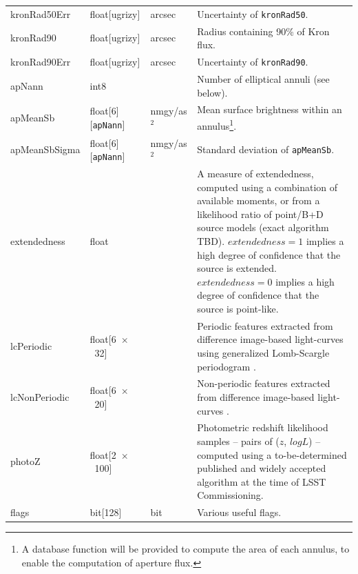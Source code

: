 \documentclass[12pt]{article}
\newcommand\x         {\hbox{$\times$}}
\begin{document}
\begin{center}
\begin{longtable}{p{3cm}p{2cm}p{2cm}p{5cm}}
kronRad50Err & float[ugrizy] & arcsec & Uncertainty of {\tt kronRad50}. \\

kronRad90 & float[ugrizy] & arcsec & Radius containing 90\% of Kron flux. \\

kronRad90Err & float[ugrizy] & arcsec & Uncertainty of {\tt kronRad90}. \\


apNann & int8 & ~ & Number of elliptical annuli (see below). \\

apMeanSb & float[6][{\tt apNann}] & nmgy/as$^2$ & Mean surface brightness within an annulus\footnote{A database function will be provided to compute the area of each annulus, to enable the computation of aperture flux.}. \\

apMeanSbSigma & float[6][{\tt apNann}] & nmgy/as$^2$ & Standard deviation of {\tt apMeanSb}. \\

extendedness & float & ~ & A measure of extendedness, computed using a combination of available moments, or from a likelihood ratio of point/B+D source models (exact algorithm TBD). $extendedness=1$ implies a high degree of confidence that the source is extended. $extendedness=0$ implies a high degree of confidence that the source is point-like. \\

lcPeriodic & float[6~\x~32] & ~ & Periodic features extracted from difference image-based light-curves using generalized Lomb-Scargle periodogram \citep[Table~4,][]{2011ApJ...733...10R}.\\

lcNonPeriodic & float[6~\x~20] & ~ & Non-periodic features extracted from difference image-based light-curves \citep[Table~5,][]{2011ApJ...733...10R}. \\

photoZ & float[2~\x~100] & ~ & Photometric redshift likelihood samples -- pairs of ($z$, $logL$) -- computed using a to-be-determined published and widely accepted algorithm at the time of LSST Commissioning. \\

flags & bit[128] & bit & Various useful flags. \\ \hline
\end{longtable}
\end{center}
\end{document}
